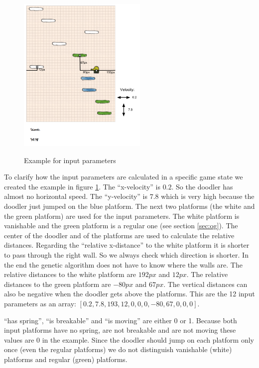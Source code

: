 \documentclass[a4paper,12pt,pagesize,headsepline,bibtotoc,titlepage,abstracton]{scrartcl}
\begin{document}
\begin{figure}[h]
\begin{center}
\includegraphics*[width=0.55\textwidth]{images/input}\\
\caption{Example for input parameters}
\label{abb:ip}
\end{center}
\end{figure}

To clarify how the input parameters are calculated in a specific game state we created the example in figure \ref{abb:ip}. The ``x-velocity'' is $0.2$. So the doodler has almost no horizontal speed. The ``y-velocity'' is $7.8$ which is very high because the doodler just jumped on the blue platform. The next two platforms (the white and the green platform) are used for the input parameters. The white platform is vanishable and the green platform is a regular one (see section \ref{sec:og}). The center of the doodler and of the platforms are used to calculate the relative distances. Regarding the ``relative x-distance'' to the white platform it is shorter to pass through the right wall. So we always check which direction is shorter. In the end the genetic algorithm does not have to know where the walls are. The relative distances to the white platform are $192px$ and $12px$. The relative distances to the green platform are $-80px$ and $67px$. The vertical distances can also be negative when the doodler gets above the platforms. This are the 12 input parameters as an array: $[0.2, 7.8, 193, 12, 0, 0, 0, -80, 67, 0, 0, 0]$.

``has spring'', ``is breakable'' and ``is moving'' are either 0 or 1. Because both input platforms have no spring, are not breakable and are not moving these values are 0 in the example. Since the doodler should jump on each platform only once (even the regular platforms) we do not distinguish vanishable (white) platforms and regular (green) platforms.
\end{document}
